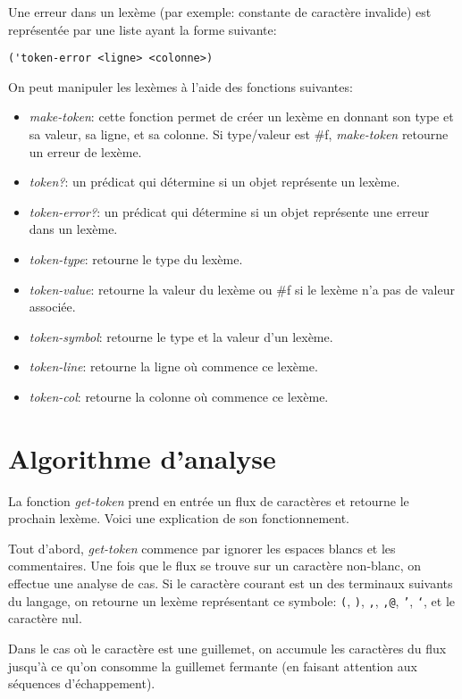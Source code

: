 \documentclass[11pt]{report}
\begin{document}
Une erreur dans un lexème (par exemple: constante de caractère
invalide) est représentée par une liste ayant la forme suivante:

\begin{verbatim}
('token-error <ligne> <colonne>)
\end{verbatim}


On peut manipuler les lexèmes à l'aide des fonctions suivantes:

\begin{itemize}
\item \emph{make-token}: cette fonction permet de créer un lexème en
  donnant son type et sa valeur, sa ligne, et sa colonne.  Si
  type/valeur est \#f, \emph{make-token} retourne un erreur de lexème.
\item \emph{token?}: un prédicat qui détermine si un objet représente
  un lexème.
\item \emph{token-error?}: un prédicat qui détermine si un objet
  représente une erreur dans un lexème.
\item \emph{token-type}: retourne le type du lexème.
\item \emph{token-value}: retourne la valeur du lexème ou \#f si le
  lexème n'a pas de valeur associée.
\item \emph{token-symbol}: retourne le type et la valeur d'un lexème.
\item \emph{token-line}: retourne la ligne où commence ce lexème.
\item \emph{token-col}: retourne la colonne où commence ce lexème.
\end{itemize}

\section{Algorithme d'analyse}

La fonction \emph{get-token} prend en entrée un flux de caractères et
retourne le prochain lexème.  Voici une explication de son
fonctionnement.

Tout d'abord, \emph{get-token} commence par ignorer les espaces blancs
et les commentaires.  Une fois que le flux se trouve sur un caractère
non-blanc, on effectue une analyse de cas.  Si le caractère courant
est un des terminaux suivants du langage, on retourne un lexème
représentant ce symbole: \texttt{(}, \texttt{)}, \texttt{,},
\texttt{,@}, \texttt{'}, \texttt{`}, et le caractère nul.

Dans le cas où le caractère est une guillemet, on accumule les
caractères du flux jusqu'à ce qu'on consomme la guillemet fermante (en
faisant attention aux séquences d'échappement).
\end{document}

